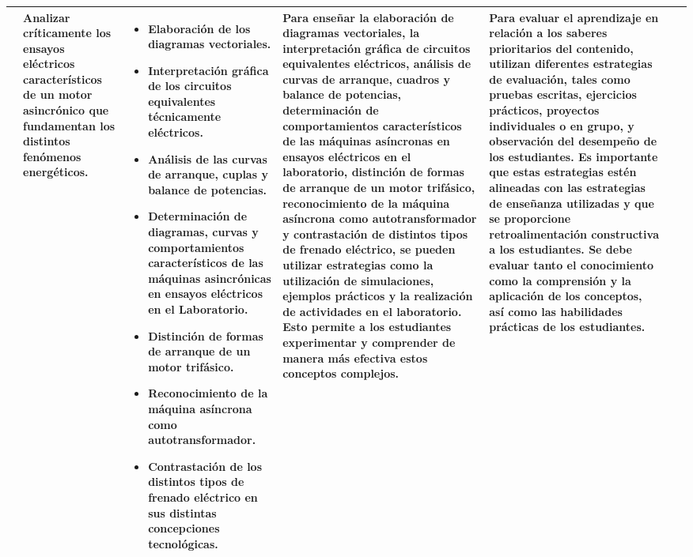 \documentclass[main]{subfiles}
\newcommand{\recursos}{\rotatebox[origin=r]{90}{Pizarrón, proyectores, videos, simuladores, libros de texto, materiales manipulativos y plataformas digitales.}}
\newcommand{\tiempos}{\rotatebox[origin=r]{90}{8 Semanas}}
\newcommand{\evaluacion}{Para evaluar el aprendizaje en relación a los saberes prioritarios del contenido, utilizan diferentes estrategias de evaluación, tales como pruebas escritas, ejercicios prácticos, proyectos individuales o en grupo, y observación del desempeño de los estudiantes. Es importante que estas estrategias estén alineadas con las estrategias de enseñanza utilizadas y que se proporcione retroalimentación constructiva a los estudiantes. Se debe evaluar tanto el conocimiento como la comprensión y la aplicación de los conceptos, así como las habilidades prácticas de los estudiantes.}
\begin{document}
\begin{longtable}{|p{0.5cm}|p{1.5cm}|p{3.5cm}|p{3.5cm}|p{4cm}|p{.5cm}|p{0.5cm}|}
& Analizar críticamente los
ensayos eléctricos
característicos de un motor
asincrónico que
fundamentan los distintos
fenómenos energéticos.& \begin{itemize}
    \item Elaboración de los diagramas vectoriales.
\item Interpretación gráfica de los circuitos equivalentes
técnicamente eléctricos.
\item Análisis de las curvas de arranque, cuplas y balance de
potencias.
\item Determinación de diagramas, curvas y comportamientos
característicos de las máquinas asincrónicas en ensayos
eléctricos en el Laboratorio.
\item Distinción de formas de arranque de un motor trifásico.
\item Reconocimiento de la máquina asíncrona como
autotransformador.
\item Contrastación de los distintos tipos de frenado eléctrico
en sus distintas concepciones tecnológicas. 

\end{itemize}& Para enseñar la elaboración de diagramas vectoriales, la interpretación gráfica de circuitos equivalentes eléctricos, análisis de curvas de arranque, cuadros y balance de potencias, determinación de comportamientos característicos de las máquinas asíncronas en ensayos eléctricos en el laboratorio, distinción de formas de arranque de un motor trifásico, reconocimiento de la máquina asíncrona como autotransformador y contrastación de distintos tipos de frenado eléctrico, se pueden utilizar estrategias como la utilización de simulaciones, ejemplos prácticos y la realización de actividades en el laboratorio. Esto permite a los estudiantes experimentar y comprender de manera más efectiva estos conceptos complejos. & \evaluacion & \recursos & \tiempos \\ \hline



\end{longtable}
\end{document}

